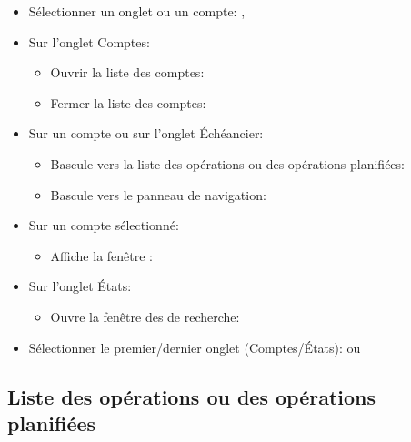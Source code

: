 \begin{itemize}
	\item Sélectionner un onglet ou un compte: \keys{\arrowkeyup}, \keys{\arrowkeydown}
	\item Sur l'onglet Comptes:
		\begin{itemize}
			\item Ouvrir la liste des comptes: \keys{\arrowkeyright}
			\item Fermer la liste des comptes: \keys{\arrowkeyleft}
		\end{itemize}
	\item Sur un compte ou sur l'onglet Échéancier:
		\begin{itemize}
			\item Bascule vers la liste des opérations ou des opérations planifiées: \keys{\arrowkeyright}
			\item Bascule vers le panneau de navigation: \keys{\arrowkeyleft}
		\end{itemize}
	\item Sur un compte sélectionné:
		\begin{itemize}
			\item Affiche la fenêtre : 
		\end{itemize}
	\item Sur l'onglet États:
		\begin{itemize}
			\item Ouvre la fenêtre des  de recherche: 
		\end{itemize}	
	\item Sélectionner le premier/dernier onglet (Comptes/États):  ou 
\end{itemize}


\subsection{Liste des opérations ou des opérations planifiées}

